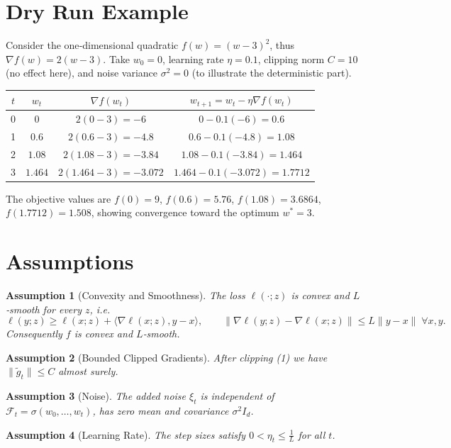 \documentclass{article}
\newtheorem{assumption}{Assumption}
\begin{document}
\section*{Dry Run Example}
Consider the one‑dimensional quadratic $f(w)=(w-3)^{2}$, thus $\nabla f(w)=2(w-3)$.  
Take $w_{0}=0$, learning rate $\eta=0.1$, clipping norm $C=10$ (no effect here), and
noise variance $\sigma^{2}=0$ (to illustrate the deterministic part).

\begin{center}
\begin{tabular}{c|c|c|c}
$t$ & $w_t$ & $\nabla f(w_t)$ & $w_{t+1}=w_t-\eta\nabla f(w_t)$ \\ \hline
0 & $0$ & $2(0-3)=-6$ & $0-0.1(-6)=0.6$ \\
1 & $0.6$ & $2(0.6-3)=-4.8$ & $0.6-0.1(-4.8)=1.08$ \\
2 & $1.08$ & $2(1.08-3)=-3.84$ & $1.08-0.1(-3.84)=1.464$ \\
3 & $1.464$ & $2(1.464-3)=-3.072$ & $1.464-0.1(-3.072)=1.7712$
\end{tabular}
\end{center}
The objective values are $f(0)=9$, $f(0.6)=5.76$, $f(1.08)=3.6864$, $f(1.7712)=1.508$,
showing convergence toward the optimum $w^{*}=3$.

\newpage
\section*{Assumptions}
\begin{assumption}[Convexity and Smoothness]\label{A1}
The loss $\ell(\cdot;z)$ is convex and $L$‑smooth for every $z$, i.e.
\[
\ell(y;z)\ge \ell(x;z)+\langle\nabla\ell(x;z),y-x\rangle,\qquad
\|\nabla\ell(y;z)-\nabla\ell(x;z)\|\le L\|y-x\|\;\forall x,y.
\]
Consequently $f$ is convex and $L$‑smooth.
\end{assumption}
\begin{assumption}[Bounded Clipped Gradients]\label{A2}
After clipping (1) we have $\|\tilde g_t\|\le C$ almost surely.
\end{assumption}
\begin{assumption}[Noise]\label{A3}
The added noise $\xi_t$ is independent of $\mathcal{F}_t=\sigma(w_0,\dots,w_t)$,
has zero mean and covariance $\sigma^{2}I_{d}$.
\end{assumption}
\begin{assumption}[Learning Rate]\label{A4}
The step sizes satisfy $0<\eta_t\le \frac{1}{L}$ for all $t$.
\end{assumption}
\end{document}

